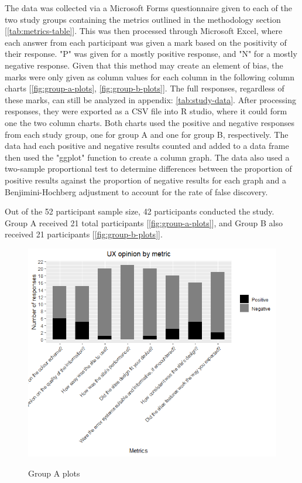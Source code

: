 \documentclass[article]{IEEEtran}
\begin{document}
        The data was collected via a Microsoft Forms questionnaire given to each of the two study groups containing the metrics outlined in the methodology section [\autoref{tab:metrics-table}]. This was then processed through Microsoft Excel, where each answer from each participant was given a mark based on the positivity of their response. "P" was given for a mostly positive response, and "N" for a mostly negative response. Given that this method may create an element of bias, the marks were only given as column values for each column in the following column charts [\autoref{fig:group-a-plots}, \autoref{fig:group-b-plots}]. The full responses, regardless of these marks, can still be analyzed in appendix: \autoref{tab:study-data}. After processing responses, they were exported as a CSV file into R studio, where it could form one the two column charts. Both charts used the positive and negative responses from each study group, one for group A and one for group B, respectively. The data had each positive and negative results counted and added to a data frame then used the "ggplot" function to create a column graph. The data also used a two-sample proportional test to determine differences between the proportion of positive results against the proportion of negative results for each graph and a Benjimini-Hochberg adjustment to account for the rate of false discovery.

        \clearpage
        
        Out of the 52 participant sample size, 42 participants conducted the study. Group A received 21 total participants [\autoref{fig:group-a-plots}], and Group B also received 21 participants [\autoref{fig:group-b-plots}].

        \begin{figure}[h]
            \caption{Group A plots}
            \includegraphics[width=\columnwidth]{images/data/group-a-plot.png}
            \label{fig:group-a-plots}
        \end{figure}
\end{document}
